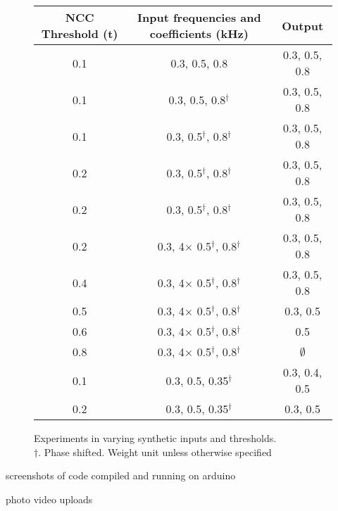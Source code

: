 \begin{figure}[ht]
    \centering
    \def\arraystretch{1.5}
    \setlength\tabcolsep{2em}
    \begin{tabular}{c | c | c}
        NCC Threshold (t)   & Input frequencies and coefficients (kHz)      & Output \\ \hline
        0.1                 & 0.3, 0.5, 0.8                                 & 0.3, 0.5, 0.8 \\
        0.1                 & 0.3, 0.5, 0.8$^\dagger$                       & 0.3, 0.5, 0.8 \\
        0.1                 & 0.3, 0.5$^\dagger$, 0.8$^\dagger$             & 0.3, 0.5, 0.8 \\
        0.2                 & 0.3, 0.5$^\dagger$, 0.8$^\dagger$             & 0.3, 0.5, 0.8 \\
        0.2                 & 0.3, 0.5$^\dagger$, 0.8$^\dagger$             & 0.3, 0.5, 0.8 \\
        0.2                 & 0.3, 4$\times$ 0.5$^\dagger$, 0.8$^\dagger$   & 0.3, 0.5, 0.8 \\
        0.4                 & 0.3, 4$\times$ 0.5$^\dagger$, 0.8$^\dagger$   & 0.3, 0.5, 0.8 \\
        0.5                 & 0.3, 4$\times$ 0.5$^\dagger$, 0.8$^\dagger$   & 0.3, 0.5      \\
        0.6                 & 0.3, 4$\times$ 0.5$^\dagger$, 0.8$^\dagger$   & 0.5           \\
        0.8                 & 0.3, 4$\times$ 0.5$^\dagger$, 0.8$^\dagger$   & $\emptyset$   \\
        0.1                 & 0.3, 0.5, 0.35$^\dagger$                      & 0.3, 0.4, 0.5 \\
        0.2                 & 0.3, 0.5, 0.35$^\dagger$                      & 0.3, 0.5     
    \end{tabular}
    \captionsetup{justification=centering}
    \caption{Experiments in varying synthetic inputs and thresholds.\\
    $\dagger.$ Phase shifted. Weight unit unless otherwise specified}
    \label{fig:synthexp}

\end{figure}

screenshots of code compiled and running on arduino

photo video uploads